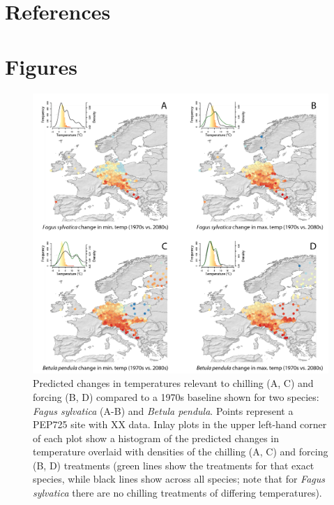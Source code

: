 \documentclass[11pt,letter]{article}
\begin{document}
\section{References}



\section{Figures}

\newpage
\begin{figure}[t!]
\centering
\includegraphics[width=1\textwidth]{figures/Fig1_noblues_densities.png}
\caption{Predicted changes in temperatures relevant to chilling (A, C) and forcing (B, D) compared to a 1970s baseline shown for two species: \emph{Fagus sylvatica} (A-B) and \emph{Betula pendula}. Points represent a PEP725 site with XX data. Inlay plots in the upper left-hand corner of each plot show a histogram of the predicted changes in temperature overlaid with densities of the chilling (A, C) and forcing (B, D) treatments (green lines show the treatments for that exact species, while black lines show across all species; note that for \emph{Fagus sylvatica} there are no chilling treatments of differing temperatures).}
  \label{fig:pep}
\end{figure}
\clearpage
\end{document}

